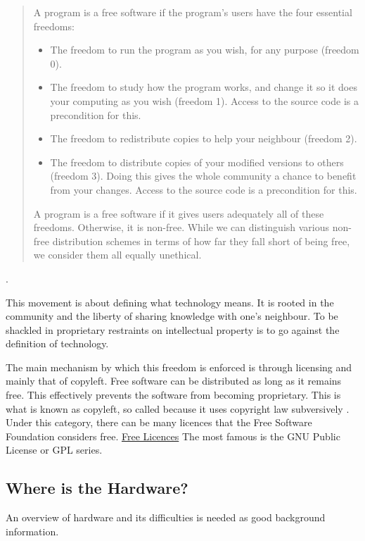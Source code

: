 \documentclass{article}
\begin{document}
\begin{quote}
    A program is a free software if the program’s users have the four essential freedoms:

    \begin{itemize}
        \item The freedom to run the program as you wish, for any purpose (freedom 0).
        \item The freedom to study how the program works, and change it so it does your computing as you wish (freedom 1). 
            Access to the source code is a precondition for this.
        \item The freedom to redistribute copies to help your neighbour (freedom 2).
        \item The freedom to distribute copies of your modified versions to others (freedom 3). 
            Doing this gives the whole community a chance to benefit from your changes. Access to the source code is a precondition for this.
    \end{itemize}
    A program is a free software if it gives users adequately all of these freedoms. Otherwise, it is non-free. 
    While we can distinguish various non-free distribution schemes in terms of how far they fall short of being free, we consider them all equally unethical.
\end{quote} \cite{b0_stallman}.

This movement is about defining what technology means. 
It is rooted in the community and the liberty of sharing knowledge with one's neighbour. 
To be shackled in proprietary restraints on intellectual property is to go against the definition of technology.

The main mechanism by which this freedom is enforced is through licensing and mainly that of copyleft. 
Free software can be distributed as long as it remains free. 
This effectively prevents the software from becoming proprietary. 
This is what is known as copyleft, so called because it uses copyright law subversively \cite{b0_stallman}.
Under this category, there can be many licences that the Free Software Foundation considers free.
\href{https://www.gnu.org/licenses/license-list.html}{Free Licences}
The most famous is the GNU Public License or GPL series.

\subsection{Where is the Hardware?}
An overview of hardware and its difficulties is needed as good background information. 
\end{document}
